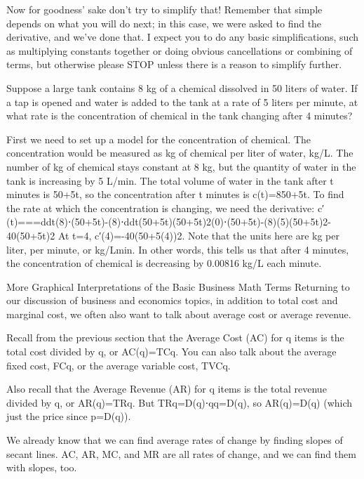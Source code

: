 \begin{example}
Now for goodness' sake don’t try to simplify that! Remember that simple depends on what you will do next; in this case, we were asked to find the derivative, and we’ve done that. I expect you to do any basic simplifications, such as multiplying constants together or doing obvious cancellations or combining of terms, but otherwise please STOP unless there is a reason to simplify further.

\begin{example}
Suppose a large tank contains 8 kg of a chemical dissolved in 50 liters of water. If a tap is opened and water is added to the tank at a rate of 5 liters per minute, at what rate is the concentration of chemical in the tank changing after 4 minutes?

\begin{solution} First we need to set up a model for the concentration of chemical. The concentration would be measured as kg of chemical per liter of water, kg/L. The number of kg of chemical stays constant at 8 kg, but the quantity of water in the tank is increasing by 5 L/min. The total volume of water in the tank after t minutes is 50+5t, so the concentration after t minutes is
c(t)=850+5t.
To find the rate at which the concentration is changing, we need the derivative:
c′(t)===ddt(8)⋅(50+5t)-(8)⋅ddt(50+5t)(50+5t)2(0)⋅(50+5t)-(8)(5)(50+5t)2-40(50+5t)2
At t=4,
c′(4)=-40(50+5(4))2.
Note that the units here are kg per liter, per minute, or kg/Lmin. In other words, this tells us that after 4 minutes, the concentration of chemical is decreasing by 0.00816 kg/L each minute.
\end{solution}\end{example}

More Graphical Interpretations of the Basic Business Math Terms
Returning to our discussion of business and economics topics, in addition to total cost and marginal cost, we often also want to talk about average cost or average revenue.

Recall from the previous section that the Average Cost (AC) for q items is the total cost divided by q, or AC(q)=TCq. You can also talk about the average fixed cost, FCq, or the average variable cost, TVCq.

Also recall that the Average Revenue (AR) for q items is the total revenue divided by q, or AR(q)=TRq. But TRq=D(q)⋅qq=D(q), so AR(q)=D(q) (which just the price since p=D(q)).

We already know that we can find average rates of change by finding slopes of secant lines. AC, AR, MC, and MR are all rates of change, and we can find them with slopes, too.


\end{example}
